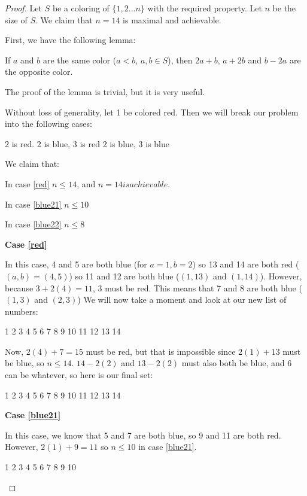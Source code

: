 \documentclass[a4paper,12pt]{scrartcl}
\newcommand{\red}{\color{red}}
\newcommand{\blue}{\color{blue}}
\newcommand{\black}{\color{black}}
\begin{document}
\begin{proof}
	Let $S$ be a coloring of $\{1,2\dots n\}$ with the required property.
Let $n$ be the size of $S$. We claim that $n=14$ is maximal and achievable.

First, we have the following lemma:
\begin{lemma*}
	If $a$ and $b$ are the same color ($a<b$, $a,b \in S$), 
	then $2a+b$, $a+2b$ and $b - 2a$ are the opposite color.
\end{lemma*}
The proof of the lemma is trivial, but it is very useful.

Without loss of generality, let 1 be colored red.
Then we will break our problem into the following cases:

\proofcase\label{red} 2 is red.
\proofcase\label{blue21} 2 is blue, 3 is red
\proofcase\label{blue22} 2 is blue, 3 is blue
\bigskip

We claim that:

In case \ref{red} $n \leq 14$, and $n=14 is achievable$.

In case \ref{blue21} $n \leq 10$

In case \ref{blue22} $n \leq 8$

\textbf{Case \ref{red}}

In this case, 4 and 5 are both blue (for $a=1, b=2$)
so 13 and 14 are both red ($(a,b) = (4,5)$)
so 11 and 12 are both blue ($(1,13)$ and $(1,14)$).
However, because $3 + 2(4) = 11$, 3 must be red. 
This means that 7 and 8 are both blue ($(1,3)$ and $(2,3)$)
We will now take a moment and look at our new list of numbers:
\begin{center}
	\red 1 2 3 \blue 4 5 \black 6 \blue 
	7 8 \black 9 10 \blue 11 12 \red 13 14
\end{center}
Now, $2(4) + 7 = 15$ must be red, but that is impossible since
$2(1) + 13$ must be blue, so $n \leq 14$.
$14 - 2(2)$ and $13 - 2(2)$ must also both be blue, and 6 can be whatever,
so here is our final set:
\begin{center}
	\red 1 2 3 \blue 4 5 \color{violet} 6 \blue 
	7 8 9 10 11 12 \red 13 14
\end{center}

\textbf{Case \ref{blue21}}

In this case, we know that 5 and 7 are both blue, so 9 and 11 are both red.
However, $2(1) + 9 = 11$ so $n \leq 10$ in case \ref{blue21}.
\begin{center}
	\red 1 \blue 2 \red 3 \black 4 \blue 5 \black 6 \blue 7 \black 8 
	\red 9 \black 10
\end{center}


\end{proof}
\end{document}
